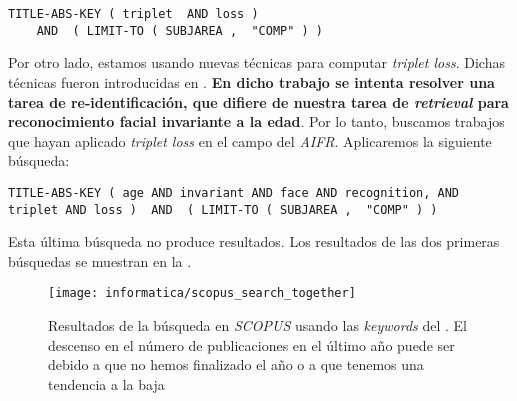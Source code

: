 \begin{lstlisting}[caption=\textit{Keywords usadas para la búsqueda en \textit{SCOPUS} para consultar la popularidad del \textit{triplet loss}. Búsqueda realizada el 17 de Septiembre de 2023}, label=code:scopus_search_tripletloss, captionpos=b]
    TITLE-ABS-KEY ( triplet  AND loss )
    AND  ( LIMIT-TO ( SUBJAREA ,  "COMP" ) )
\end{lstlisting}

Por otro lado, estamos usando nuevas técnicas para computar \textit{triplet loss}. Dichas técnicas fueron introducidas en \cite{informatica:principal}. \textbf{En dicho trabajo se intenta resolver una tarea de re-identificación, que difiere de nuestra tarea de \textit{retrieval} para reconocimiento facial invariante a la edad}. Por lo tanto, buscamos trabajos que hayan aplicado \textit{triplet loss} en el campo del \textit{AIFR}. Aplicaremos la siguiente búsqueda:

\begin{lstlisting}[caption=Keywords usandos para la búsqueda de trabajos que combinen \textit{AIFR} y \textit{triplet loss} en \textit{SCOPUS}, label=code:scopus_search_especifico, captionpos=b]
    TITLE-ABS-KEY ( age AND invariant AND face AND recognition, AND triplet AND loss )  AND  ( LIMIT-TO ( SUBJAREA ,  "COMP" ) )
\end{lstlisting}

Esta última búsqueda no produce resultados. Los resultados de las dos primeras búsquedas se muestran en la .

\begin{figure}[H]
	\centering
	\texttt{[image: informatica/scopus\_search\_together]}
	\caption{Resultados de la búsqueda en \textit{SCOPUS} usando las \textit{keywords} del . El descenso en el número de publicaciones en el último año puede ser debido a que no hemos finalizado el año o a que tenemos una tendencia a la baja}
	\label{img:scopus_together}
\end{figure}

